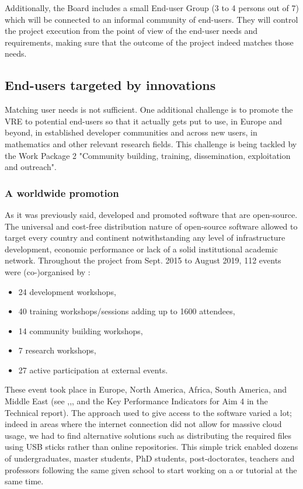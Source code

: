 \documentclass{deliverablereport}
\begin{document}
Additionally, the Board includes a small End-user Group (3 to 4 persons out
of 7) which will be connected to an informal community of
end-users. They will control the project execution from the point of
view of the end-user needs and requirements, making sure that the
outcome of the project indeed matches those needs.

\subsection{End-users targeted by \ODK innovations}

Matching user needs is not sufficient. One additional challenge is to
promote the VRE to potential end-users so that it actually gets put to
use, in Europe and beyond, in established developer communities and
across new users, in mathematics and other relevant research fields. This
challenge is being tackled by the Work Package 2 "Community building,
training, dissemination, exploitation and outreach".


\subsubsection{A worldwide promotion}

As it was previously said, \ODK developed and promoted software that are open-source. The universal and cost-free distribution nature of open-source software allowed \ODK to target every country and continent notwithstanding any level of infrastructure development, economic performance or lack of a solid institutional academic network.
Throughout the project from Sept. 2015 to August 2019, 112 events were
(co-)organised by \ODK:
\begin{itemize}
\item 24 development workshops,
\item 40 training workshops/sessions adding up to 1600 attendees,
\item 14 community building workshops,
\item 7 research workshops,
\item 27 active participation at external events.
\end{itemize}

These event took place in Europe, North America, Africa, South America,
and Middle East (see ,,,
and the Key Performance Indicators for Aim 4 in the Technical report).
The approach used to give access to the software varied a lot; indeed
in areas where the internet connection did not allow for massive cloud
usage, we had to find alternative solutions such as distributing the
required files using USB sticks rather than online repositories. This
simple trick enabled dozens of undergraduates, master students, PhD
students, post-doctorates, teachers and professors following the same
given school to start working on a \SageMath or \Jupyter tutorial at
the same time.
\end{document}
